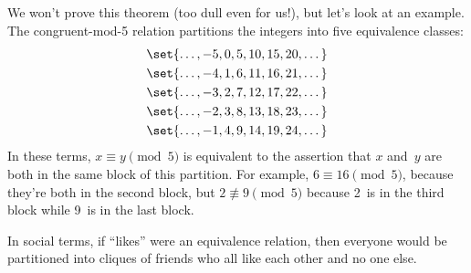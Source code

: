 We won't prove this theorem (too dull even for us!), but let's look at
an example.  The congruent-mod-5 relation partitions the integers into
five equivalence classes:
\begin{gather*}
    \set{ \dots, -5, 0, 5, 10, 15, 20, \dots } \\
    \set{ \dots, -4, 1, 6, 11, 16, 21, \dots } \\
    \set{ \dots, -3, 2, 7, 12, 17, 22, \dots } \\
    \set{ \dots, -2, 3, 8, 13, 18, 23, \dots } \\
    \set{ \dots, -1, 4, 9, 14, 19, 24, \dots }
\end{gather*}
In these terms, $x \equiv y \pmod{5}$ is equivalent to the assertion
that $x$ and~$y$ are both in the same block of this partition.  For
example, $6 \equiv 16 \pmod{5}$, because they're both in the second
block, but $2 \nequiv 9 \pmod{5}$ because 2~is in the third block
while 9~is in the last block.

In social terms, if ``likes'' were an equivalence relation, then
everyone would be partitioned into cliques of friends who all like
each other and no one else.

\begin{problems}
\homeworkproblems
{}
\end{problems}

\endinput


